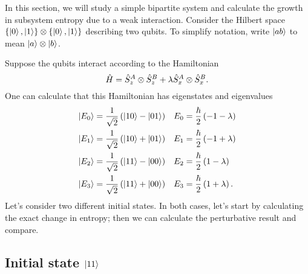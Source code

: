 In this section, we will study a simple bipartite system and calculate the growth in subsystem entropy due to a weak interaction. Consider the Hilbert space \(\{\left|0\right\rangle, \left|1\right\rangle\}\otimes\{\left|0\right\rangle, \left|1\right\rangle\}\) describing two qubits. To simplify notation, write \(\left|ab\right\rangle\) to mean \(\left|a\right\rangle\otimes\left|b\right\rangle\).

Suppose the qubits interact according to the Hamiltonian
\[
\hat{H} = \hat{S}_z^{A}\otimes\hat{S}_z^B + \lambda \hat{S}_x^A \otimes \hat{S}_x^B.
\]
One can calculate that this Hamiltonian has eigenstates and eigenvalues
\begin{align*}
\left|E_0\right\rangle &= \frac{1}{\sqrt{2}} \left(\left|10\right\rangle-\left|01\right\rangle\right) &
E_0 &= \frac{\hbar}{2} \left(-1-\lambda\right) \\
\left|E_1\right\rangle &= \frac{1}{\sqrt{2}} \left(\left|10\right\rangle+\left|01\right\rangle\right) &
E_1 &= \frac{\hbar}{2} \left(-1+\lambda\right) \\
\left|E_2\right\rangle &= \frac{1}{\sqrt{2}} \left(\left|11\right\rangle-\left|00\right\rangle\right) &
E_2 &= \frac{\hbar}{2} \left(1-\lambda\right) \\
\left|E_3\right\rangle &= \frac{1}{\sqrt{2}} \left(\left|11\right\rangle+\left|00\right\rangle\right) &
E_3 &= \frac{\hbar}{2} \left(1+\lambda\right).
\end{align*}
Let's consider two different initial states. In both cases, let's start by calculating the exact change in entropy; then we can calculate the perturbative result and compare.

\subsection{Initial state \(\left|11\right\rangle\)}

